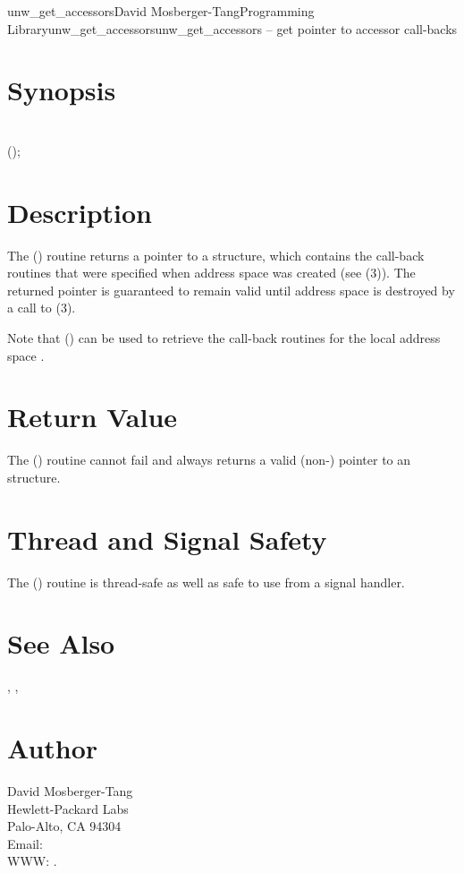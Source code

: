 \documentclass{article}
\begin{document}
\begin{Name}{3}{unw\_get\_accessors}{David Mosberger-Tang}{Programming Library}{unw\_get\_accessors}unw\_get\_accessors -- get pointer to accessor call-backs
\end{Name}

\section{Synopsis}

\\

();\\

\section{Description}

The () routine returns a pointer to a
 structure, which contains the call-back
routines that were specified when address space  was created
(see (3)).  The returned pointer is
guaranteed to remain valid until address space  is destroyed
by a call to (3).

Note that () can be used to retrieve the
call-back routines for the local address space
.

\section{Return Value}

The () routine cannot fail and always
returns a valid (non-) pointer to an
 structure.

\section{Thread and Signal Safety}

The () routine is thread-safe as well as
safe to use from a signal handler.

\section{See Also}

,
,

\section{Author}

\noindent
David Mosberger-Tang\\
Hewlett-Packard Labs\\
Palo-Alto, CA 94304\\
Email: \\
WWW: .
\LatexManEnd
\end{document}
